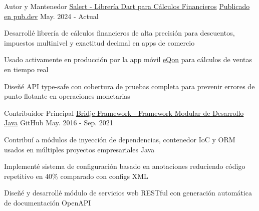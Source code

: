 
\begin{cventries}

  \cventry
    {Autor y Mantenedor} %
    {\href{https://github.com/zp1ke/salert}{Salert - Librería Dart para Cálculos Financieros}} %
    {\href{https://pub.dev/packages/salert}{Publicado en pub.dev}} %
    {May. 2024 - Actual} %
    {
      \begin{cvitems} %
        \item {Desarrollé librería de cálculos financieros de alta precisión para descuentos, impuestos multinivel y exactitud decimal en apps de comercio}
        \item {Usado activamente en producción por la app móvil {\href{https://eqon.ec/}{eQon}} para cálculos de ventas en tiempo real}
        \item {Diseñé API type-safe con cobertura de pruebas completa para prevenir errores de punto flotante en operaciones monetarias}
      \end{cvitems}
    }

  \cventry
    {Contribuidor Principal} %
    {\href{https://github.com/touwolf/bridje-framework}{Bridje Framework - Framework Modular de Desarrollo Java}} %
    {\faGithubSquare\acvHeaderIconSep GitHub} %
    {May. 2016 - Sep. 2021} %
    {
      \begin{cvitems} %
        \item {Contribuí a módulos de inyección de dependencias, contenedor IoC y ORM usados en múltiples proyectos empresariales Java}
        \item {Implementé sistema de configuración basado en anotaciones reduciendo código repetitivo en 40\% comparado con configs XML}
        \item {Diseñé y desarrollé módulo de servicios web RESTful con generación automática de documentación OpenAPI}
      \end{cvitems}
    }


\end{cventries}
